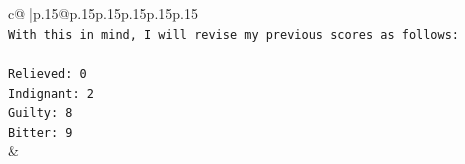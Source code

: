 \documentclass{article}
\begin{document}
{\begin{supertabular}{c@{$\;$}|p{.15\linewidth}@{}p{.15\linewidth}p{.15\linewidth}p{.15\linewidth}p{.15\linewidth}p{.15\linewidth}}
{{{\\ 
\texttt{With this in mind, I will revise my previous scores as follows:} \\
\\ 
\texttt{Relieved: 0} \\
\texttt{Indignant: 2} \\
\texttt{Guilty: 8} \\
\texttt{Bitter: 9} \\
            }
        }
    }
    & \\ \\

\end{supertabular}
}
\end{document}
